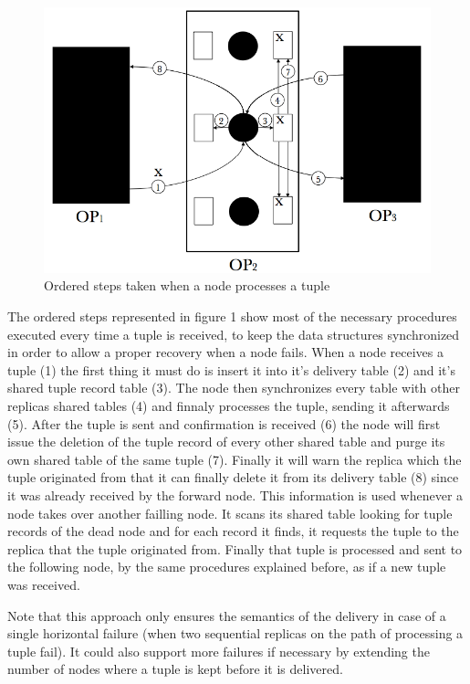 \documentclass[times, 10pt,twocolumn]{article}
\begin{document}

\begin{figure}[h] 
	\includegraphics[width=\columnwidth]{semantics}
	\caption{Ordered steps taken when a node processes a tuple}
\end{figure}

The ordered steps represented in figure 1 show most of the necessary 
procedures executed every time a tuple is received, to keep the data structures synchronized in order to allow a
proper recovery when a node fails. When a node receives a tuple (1) the first
thing it must do is insert it into it's delivery table (2) and it's shared tuple
record table (3). The node then synchronizes every table with other replicas
shared tables (4) and finnaly processes the tuple, sending it afterwards (5). After the
tuple is sent and confirmation is received (6) the node will first issue the
deletion of the tuple record of every other shared table and purge its own
shared table of the same tuple (7). Finally it will warn the replica which the
tuple originated from that it can finally delete it from its delivery table (8)
since it was already received by the forward node. This information is
used whenever a node takes over another failling node. It scans its shared
table looking for tuple records of the dead node and for each record it finds,
it requests the tuple to the replica that the tuple originated from. Finally that tuple is
processed and sent to the following node, by the same procedures explained
before, as if a new tuple was received. 

Note that this approach only
ensures the semantics of the delivery in case of a single horizontal
failure (when two sequential replicas on the path of processing a tuple
fail). It could also support more failures if necessary by extending the
number of nodes where a tuple is kept before it is delivered.
\end{document}
